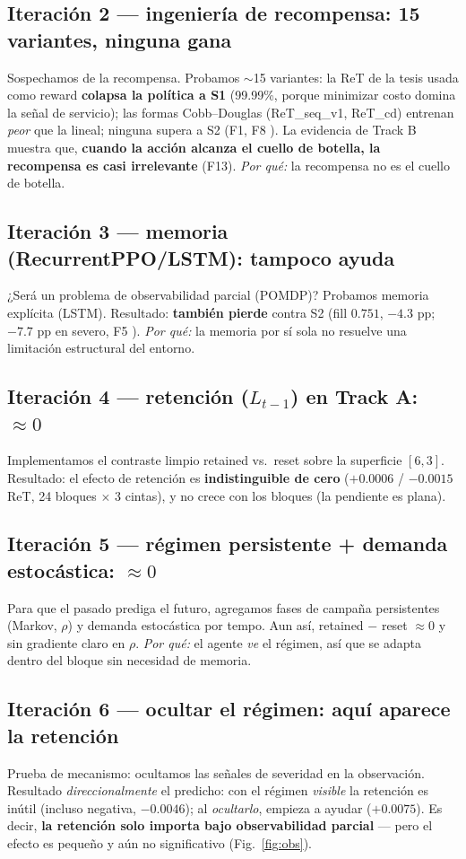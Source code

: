 \documentclass[11pt,a4paper]{article}
\newcommand{\good}[1]{\textcolor{green!45!black}{\textbf{#1}}}
\newcommand{\bad}[1]{\textcolor{red!60!black}{\textbf{#1}}}
\begin{document}
\subsection{Iteración 2 --- ingeniería de recompensa: 15 variantes, ninguna gana}
Sospechamos de la recompensa. Probamos $\sim$15 variantes: la ReT de la tesis usada como
reward \bad{colapsa la política a S1} (99.99\%, porque minimizar costo domina la señal
de servicio); las formas Cobb--Douglas (ReT\_seq\_v1, ReT\_cd) entrenan \emph{peor} que
la lineal; ninguna supera a S2 (F1, F8 \cite{findings}). La evidencia de Track B muestra
que, \textbf{cuando la acción alcanza el cuello de botella, la recompensa es casi
irrelevante} (F13). \emph{Por qué:} la recompensa no es el cuello de botella.

\subsection{Iteración 3 --- memoria (RecurrentPPO/LSTM): tampoco ayuda}
¿Será un problema de observabilidad parcial (POMDP)? Probamos memoria explícita
(LSTM). Resultado: \bad{también pierde} contra S2 (fill $0.751$, $-4.3$ pp; $-7.7$ pp en
severo, F5 \cite{findings}). \emph{Por qué:} la memoria por sí sola no resuelve una
limitación estructural del entorno.

\subsection{Iteración 4 --- retención ($L_{t-1}$) en Track A: $\approx 0$}
Implementamos el contraste limpio retained vs.\ reset sobre la superficie $[6,3]$.
Resultado: el efecto de retención es \bad{indistinguible de cero} ($+0.0006$ / $-0.0015$
ReT, 24 bloques $\times$ 3 cintas), y no crece con los bloques (la pendiente es plana).

\subsection{Iteración 5 --- régimen persistente + demanda estocástica: $\approx 0$}
Para que el pasado prediga el futuro, agregamos fases de campaña persistentes (Markov,
$\rho$) y demanda estocástica por tempo. Aun así, retained $-$ reset $\approx 0$ y sin
gradiente claro en $\rho$. \emph{Por qué:} el agente \emph{ve} el régimen, así que se
adapta dentro del bloque sin necesidad de memoria.

\subsection{Iteración 6 --- ocultar el régimen: aquí aparece la retención}
Prueba de mecanismo: ocultamos las señales de severidad en la observación. Resultado
\emph{direccionalmente} el predicho: con el régimen \emph{visible} la retención es inútil
(incluso negativa, $-0.0046$); al \emph{ocultarlo}, empieza a ayudar ($+0.0075$). Es
decir, \good{la retención solo importa bajo observabilidad parcial} --- pero el efecto es
pequeño y aún no significativo (Fig.\ \ref{fig:obs}).
\end{document}
